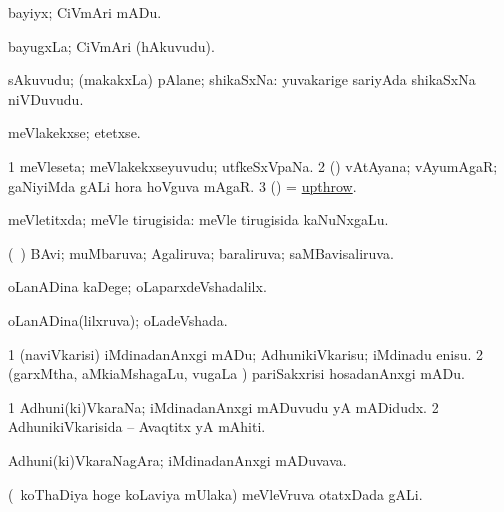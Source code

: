 \bentry
{} 
\gl{\sakirx}
\expl{}
\bmng
bayiyx; CiVmAri mADu. 
\emng
\eentry

\bentry
{} 
\gl{\nA}
\expl{}
\bmng
bayugxLa; CiVmAri (hAkuvudu). 
\emng
\eentry

\bentry
{} 
\gl{\nA}
\expl{}
\bmng
sAkuvudu; (makakxLa) pAlane; shikaSxNa:  yuvakarige sariyAda shikaSxNa niVDuvudu. 
\emng
\eentry

\bentry
{} 
\gl{\sakirx}
\bmng
meVlakekxse; etetxse. 
\emng
\eentry

\bentry
{} 
\gl{\nA}
\expl{}
\bmng
\bnum
\num{1} meVleseta; meVlakekxseyuvudu; utfkeSxVpaNa. 
\num{2} (\gaNi) vAtAyana; vAyumAgaR; gaNiyiMda gALi hora hoVguva mAgaR. 
\num{3} (\BUvi) = \hyperlink{upthrow}{upthrow}. 
\enum
\emng
\eentry

\bentry
{} 
\gl{\gu}
\expl{}
\bmng
meVletitxda; meVle tirugisida:  meVle tirugisida kaNuNxgaLu. 
\emng
\eentry

\bentry
{} 
\gl{\gu}
\expl{}
\bmng
(\kanmu\ \ame) BAvi; muMbaruva; Agaliruva; baraliruva; saMBavisaliruva. 
\emng
\eentry

\bentry
{} 
\gl{\kirxvi}
\expl{}
\bmng
oLanADina kaDege; oLaparxdeVshadalilx. 
\emng
\eentry

\bentry
{} 
\gl{\gu}
\expl{}
\bmng
oLanADina(lilxruva); oLadeVshada. 
\emng
\eentry

\bentry
{} 
\gl{\sakirx}
\expl{}
\bmng
\bnum
\num{1} (naviVkarisi) iMdinadanAnxgi mADu; AdhunikiVkarisu; iMdinadu enisu. 
\num{2} (garxMtha, aMkiaMshagaLu, \mo vugaLa \vi) pariSakxrisi hosadanAnxgi mADu. 
\enum
\emng
\eentry

\bentry
{} 
\gl{\nA}
\expl{}
\bmng
\bnum
\num{1} Adhuni(ki)VkaraNa; iMdinadanAnxgi mADuvudu yA mADidudx. 
\num{2} AdhunikiVkarisida -- Avaqtitx yA mAhiti. 
\enum
\emng
\eentry

\bentry
{} 
\gl{\nA}
\expl{}
\bmng
Adhuni(ki)VkaraNagAra; iMdinadanAnxgi mADuvava. 
\emng
\eentry

\bentry
{}
\gl{\nA}
\expl{}
\bmng
(\kanmu\ koThaDiya hoge koLaviya mUlaka) meVleVruva otatxDada gALi. 
\emng
\eentry

